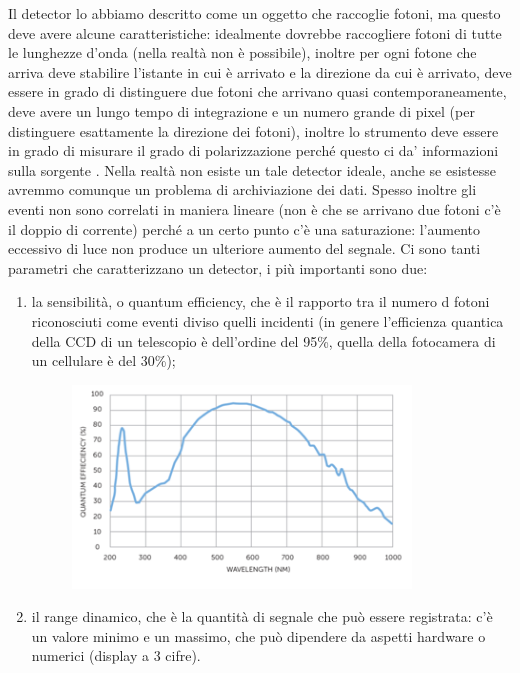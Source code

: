 \documentclass[a4paper,11pt]{article}
\begin{document}
\vspace{3mm}
Il detector lo abbiamo descritto come un oggetto che raccoglie fotoni, ma questo deve avere alcune caratteristiche: idealmente dovrebbe raccogliere fotoni di tutte le lunghezze d’onda (nella realtà non è possibile), inoltre per ogni fotone che arriva deve stabilire l’istante in cui è arrivato e la direzione da cui è arrivato, deve essere in grado di distinguere due fotoni che arrivano quasi contemporaneamente, deve avere un lungo tempo di integrazione e un numero grande di pixel (per distinguere esattamente la direzione dei fotoni), inoltre lo strumento deve essere in grado di misurare il grado di polarizzazione perché questo ci da’ informazioni sulla sorgente . Nella realtà non esiste un tale detector ideale, anche se esistesse avremmo comunque un problema di archiviazione dei dati.
\newline
Spesso inoltre gli eventi non sono correlati in maniera lineare (non è che se arrivano due fotoni c’è il doppio di corrente) perché a un certo punto c’è una saturazione: l’aumento eccessivo di luce non produce un ulteriore aumento del segnale.
\newline
 Ci sono tanti parametri che caratterizzano un detector, i più importanti sono due:
 \begin{enumerate}
     \item la sensibilità, o quantum efficiency, che è il rapporto tra il numero d fotoni riconosciuti come eventi diviso quelli incidenti (in genere l’efficienza quantica della CCD di un telescopio è dell’ordine del 95\%, quella della fotocamera di un cellulare è del 30\%);
      \begin{figure}[h!!]
        \centering
        \includegraphics[width=9cm]{astro1.png}
        \label{}
    \end{figure}
     \item il range dinamico, che è la quantità di segnale che può essere registrata: c’è un valore minimo e un massimo, che può dipendere da aspetti hardware o numerici (display a 3 cifre).
 \end{enumerate}
\end{document}
